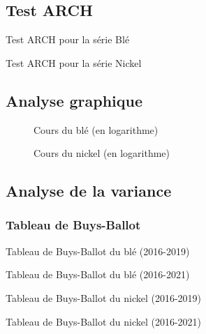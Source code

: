 \documentclass[12pt,a4paper]{article}
\begin{document}
\subsection{Test ARCH}\label{appendix:arch_test}
\begin{table}[H]
    \centering
    \caption{Test ARCH pour la série Blé}
    \label{tab:hetero_ble}
    \sffamily
    
\end{table}

\begin{table}[H]
    \centering
    \caption{Test ARCH pour la série Nickel}
    \label{tab:hetero_nickel}
    \sffamily
    
\end{table}

\subsection{Analyse graphique}
\begin{figure}[H]
    \centering
    \resizebox{0.8\textwidth}{!}{}
    \caption{Cours du blé (en logarithme)}
    \label{fig:ble_log}
\end{figure}
\begin{figure}[H]
    \centering
    \resizebox{0.8\textwidth}{!}{}
    \caption{Cours du nickel (en logarithme)}
    \label{fig:nickel_log}
\end{figure}

\subsection{Analyse de la variance}
\subsubsection{Tableau de Buys-Ballot}\label{appendix:bb}
\begin{table}[H]
    \centering
    \caption{Tableau de Buys-Ballot du blé (2016-2019) }
    \label{tab:bb_ble19}
    \sffamily
    \resizebox{\textwidth}{!}{}
\end{table}
\begin{table}[H]
    \centering
    \caption{Tableau de Buys-Ballot du blé (2016-2021) }
    \label{tab:bb_ble21}
    \sffamily
    \resizebox{\textwidth}{!}{}
\end{table}
\begin{table}[H]
    \centering
    \caption{Tableau de Buys-Ballot du nickel (2016-2019) }
    \label{tab:bb_nickel19}
    \sffamily
    \resizebox{\textwidth}{!}{}
\end{table}
\begin{table}[H]
    \centering
    \caption{Tableau de Buys-Ballot du nickel (2016-2021) }
    \label{tab:bb_nickel21}
    \sffamily
    \resizebox{\textwidth}{!}{}
\end{table}
\clearpage
\end{document}
